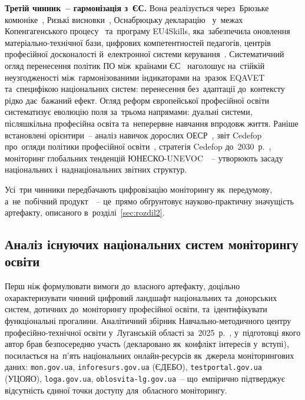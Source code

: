 \textbf{Третій чинник~-- гармонізація з~ЄС.} Вона реалізується через~Брюзьке комюніке~\cite{BrugesCommunique2010}, Ризькі висновки~\cite{RigaConclusions2015}, Оснабрюцьку декларацію~\cite{OsnabruckDeclaration2020} у~межах Копенгагенського процесу~\cite{CopenhagenProcess2002} та~програму EU4Skills, яка~забезпечила оновлення матеріально-технічної бази, цифрових компетентностей педагогів, центрів професійної досконалості й~електронної системи керування~\cite{Kulachynskyi2024EU4Skills, Storonyanska2025EuVET}. Систематичний огляд перенесення політик ПО між~країнами ЄС~\cite{Ciantar2025VETPolicy} наголошує на~стійкій неузгодженості між~гармонізованими індикаторами на~зразок EQAVET~\cite{EQAVET2009Framework} та~специфікою національних систем: перенесення без~адаптації до~контексту рідко дає~бажаний ефект. Огляд реформ європейської професійної освіти~\cite{Rauner2024EuropeanVET} систематизує еволюцію поля за~трьома напрямами: дуальні системи, післяшкільна професійна освіта та~неперервне навчання впродовж життя. Раніше встановлені орієнтири~-- аналіз навичок дорослих ОЕСР~\cite{OECD2010}, звіт Cedefop про~огляди політики професійної освіти~\cite{CedefopReport2017}, стратегія Cedefop до~2030~р.~\cite{Cedefop2020}, моніторинг глобальних тенденцій ЮНЕСКО-UNEVOC~\cite{UNEScounevoc2013}~-- утворюють засаду національних і~наднаціональних звітних структур.

Усі~три чинники передбачають цифровізацію моніторингу як~передумову, а~не~побічний продукт~\cite{Zlenko2024DigitalHR}~-- це~прямо обґрунтовує науково-практичну значущість артефакту, описаного в~розділі~\ref{sec:rozdil2}.

\subsection{Аналіз існуючих національних систем моніторингу освіти}
\label{sec:p1-landscape}

Перш ніж формулювати вимоги до~власного артефакту, доцільно охарактеризувати чинний цифровий ландшафт національних та~донорських систем, дотичних до~моніторингу професійної освіти, та~ідентифікувати функціональні прогалини. Аналітичний збірник Навчально-методичного центру професійно-технічної освіти у~Луганській області за~2025~р.~\cite{NMTsPTO2025}, у~підготовці якого автор брав безпосередню участь (декларовано як~конфлікт інтересів у~вступі), посилається на~п'ять національних онлайн-ресурсів як~джерела моніторингових даних: \texttt{mon.gov.ua}, \texttt{inforesurs.gov.ua} (ЄДЕБО), \texttt{testportal.gov.ua} (УЦОЯО), \texttt{loga.gov.ua}, \texttt{oblosvita-lg.gov.ua}~-- що~емпірично підтверджує відсутність єдиної точки доступу для~обласного моніторингу.

